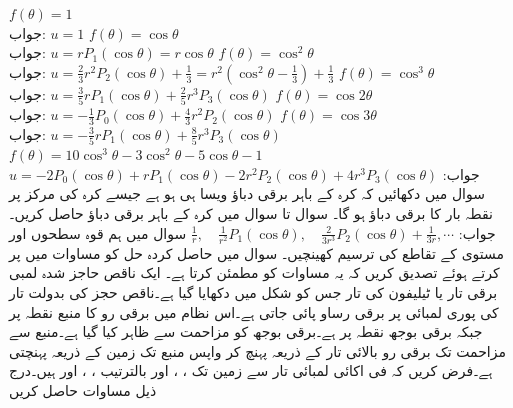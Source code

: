 \quad
$f(\theta)=1$\\
جواب:\quad
$u=1$
\quad
$f(\theta)=\cos \theta$\\
جواب:\quad
$u=rP_1(\cos\theta)=r\cos\theta$
\quad
$f(\theta)=\cos^2 \theta$\\
جواب:\quad
$u=\tfrac{2}{3}r^2P_2(\cos\theta)+\tfrac{1}{3}=r^2(\cos^2\theta-\tfrac{1}{3})+\tfrac{1}{3}$
\quad
$f(\theta)=\cos^3 \theta$\\
جواب:\quad
$u=\tfrac{3}{5}rP_1(\cos\theta)+\tfrac{2}{5}r^3P_3(\cos\theta)$
\quad
$f(\theta)=\cos 2\theta$\\
جواب:\quad
$u=-\tfrac{1}{3}P_0(\cos\theta)+\tfrac{4}{3}r^2P_2(\cos\theta)$
\quad
$f(\theta)=\cos 3\theta$\\
جواب:\quad
$u=-\tfrac{3}{5}rP_1(\cos\theta)+\tfrac{8}{5}r^3P_3(\cos\theta)$
\quad
$f(\theta)=10\cos^3\theta-3\cos^2\theta-5\cos\theta-1$\\
جواب:\quad
$u=-2P_0(\cos\theta)+rP_1(\cos\theta)-2r^2P_2(\cos\theta)+4r^3P_3(\cos\theta)$
\quad
سوال  میں دکھائیں کہ کرہ کے باہر برقی دباؤ ویسا ہی ہو ہے جیسے کرہ کی مرکز پر نقطہ بار کا برقی دباؤ ہو گا۔
\quad
سوال  تا سوال  میں کرہ کے باہر برقی دباؤ حاصل کریں۔\\
جواب:\quad
$\tfrac{1}{r},\quad \tfrac{1}{r^2}P_1(\cos\theta),\quad \tfrac{2}{3r^3}P_2(\cos\theta)+\tfrac{1}{3r},\cdots$
\quad
سوال  میں ہم قوہ سطحوں  اور  مستوی کے تقاطع کی ترسیم کھینچیں۔ 
\quad
سوال  میں حاصل کردہ حل کو مساوات  میں پر کرتے ہوئے تصدیق کریں کہ یہ مساوات   کو مطمئن کرتا ہے۔
\quad {}
ایک ناقص حاجز شدہ لمبی برقی تار یا ٹیلیفون کی تار  جس کو شکل  میں دکھایا گیا ہے۔ناقص حجز  کی بدولت تار کی پوری لمبائی پر برقی رساو پائی جاتی ہے۔اس نظام میں برقی رو  کا منبع نقطہ  پر جبکہ برقی بوجھ نقطہ  پر ہے۔برقی بوجھ کو مزاحمت سے ظاہر کیا گیا ہے۔منبع سے مزاحمت تک برقی رو  بالائی تار کے ذریعہ پہنچ کر واپس منبع تک زمین کے ذریعہ پہنچتی ہے۔فرض کریں کہ فی اکائی لمبائی تار سے زمین تک ، ،  اور  بالترتیب ، ،  اور  ہیں۔درج ذیل مساوات حاصل کریں

